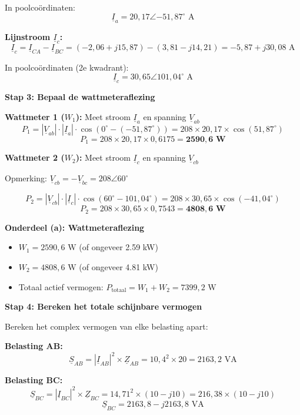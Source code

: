 \documentclass[a4paper,11pt]{article}
\begin{document}
\begin{oefenblok}
    In poolcoördinaten:
    \[\underline{I}_a = 20{,}17\angle{-51{,}87^\circ} \text{ A}\]

    \textbf{Lijnstroom $\underline{I}_c$:}
    \[\underline{I}_c = \underline{I}_{CA} - \underline{I}_{BC} = (-2{,}06 + j15{,}87) - (3{,}81 - j14{,}21) = -5{,}87 + j30{,}08 \text{ A}\]

    In poolcoördinaten (2e kwadrant):
    \[\underline{I}_c = 30{,}65\angle{101{,}04^\circ} \text{ A}\]

    \textbf{Stap 3: Bepaal de wattmeteraflezing}

    \textbf{Wattmeter 1 ($W_1$):} Meet stroom $\underline{I}_a$ en spanning $\underline{V}_{ab}$
    \[P_1 = |\underline{V}_{ab}| \cdot |\underline{I}_a| \cdot \cos(0^\circ - (-51{,}87^\circ)) = 208 \times 20{,}17 \times \cos(51{,}87^\circ)\]
    \[\boxed{P_1 = 208 \times 20{,}17 \times 0{,}6175 = \mathbf{2590{,}6 \text{ W}}}\]

    \textbf{Wattmeter 2 ($W_2$):} Meet stroom $\underline{I}_c$ en spanning $\underline{V}_{cb}$

    Opmerking: $\underline{V}_{cb} = -\underline{V}_{bc} = 208\angle{60^\circ}$

    \[P_2 = |\underline{V}_{cb}| \cdot |\underline{I}_c| \cdot \cos(60^\circ - 101{,}04^\circ) = 208 \times 30{,}65 \times \cos(-41{,}04^\circ)\]
    \[\boxed{P_2 = 208 \times 30{,}65 \times 0{,}7543 = \mathbf{4808{,}6 \text{ W}}}\]

    \textbf{Onderdeel (a): Wattmeteraflezing}
    \begin{itemize}
        \item $W_1 = 2590{,}6 \text{ W}$ (of ongeveer 2.59 kW)
        \item $W_2 = 4808{,}6 \text{ W}$ (of ongeveer 4.81 kW)
        \item Totaal actief vermogen: $P_{\text{totaal}} = W_1 + W_2 = 7399{,}2 \text{ W}$
    \end{itemize}

    \textbf{Stap 4: Bereken het totale schijnbare vermogen}

    Bereken het complex vermogen van elke belasting apart:

    \textbf{Belasting AB:}
    \[\boxed{\underline{S}_{AB} = |\underline{I}_{AB}|^2 \times \underline{Z}_{AB} = 10{,}4^2 \times 20 = 2163{,}2 \text{ VA}}\]

    \textbf{Belasting BC:}
    \[\underline{S}_{BC} = |\underline{I}_{BC}|^2 \times \underline{Z}_{BC} = 14{,}71^2 \times (10 - j10) = 216{,}38 \times (10 - j10)\]
    \[\boxed{\underline{S}_{BC} = 2163{,}8 - j2163{,}8 \text{ VA}}\]


\end{oefenblok}
\end{document}
